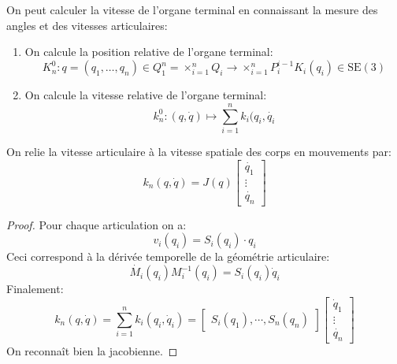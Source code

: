 \documentclass[math]{cours}
\begin{document}
\begin{proposition}
	On peut calculer la vitesse de l'organe terminal en connaissant la mesure des angles et des vitesses articulaires:
	\begin{enumerate}
		\item On calcule la position relative de l'organe terminal:
			\begin{equation*}
				K_{n}^{0} : q = (q_{1}, \ldots, q_{n}) \in Q_{1}^{n} = \times_{i = 1}^{n} Q_{i} \to \times_{i = 1}^{n}P_{i}^{i - 1}K_{i}(q_{i}) \in \mathrm{SE}(3)
			\end{equation*}
		\item On calcule la vitesse relative de l'organe terminal:
		      \begin{equation*}
			      k_{n}^{0}: (q, \dot{q}) \mapsto \sum_{i = 1}^{n} k_{i}(q_{i}, \dot{q_{i}}
		      \end{equation*}
	\end{enumerate}
	\label{prop:vitesseterminale}
\end{proposition}

\begin{thm}
	On relie la vitesse articulaire à la vitesse spatiale des corps en mouvements par:
	\begin{equation*}
		k_{n}(q, \dot{q}) = J(q)\begin{bmatrix}
			\dot{q_{1}} \\
			\vdots      \\
			\dot{q_{n}}
		\end{bmatrix}
	\end{equation*}
\end{thm}
\begin{proof}
	Pour chaque articulation on a:
	\begin{equation*}
		v_{i}(q_{i}) = S_{i}(q_{i})\cdot{q}_{i}
	\end{equation*}
	Ceci correspond à la dérivée temporelle de la géométrie articulaire:
	\begin{equation*}
		\dot{M_{i}}(q_{i})M_{i}^{-1}(q_{i}) = S_{i}(q_{i})\dot{q}_{i}
	\end{equation*}
	Finalement:
	\begin{equation*}
		k_{n}(q, \dot{q}) = \sum_{i = 1}^{n}k_{i}(q_{i}, \dot{q}_{i}) =
		\begin{bmatrix}
			S_{i}(q_{1}), \cdots, S_{n}(q_{n})
		\end{bmatrix}
		\begin{bmatrix}
			\dot{q}_{1} \\
			\vdots      \\
			\dot{q_{n}}
		\end{bmatrix}
	\end{equation*}
	On reconnaît bien la jacobienne.
\end{proof}
\end{document}

